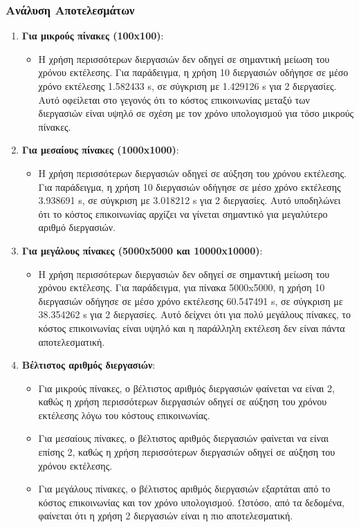 \documentclass{article}
\begin{document}
\subsubsection*{Ανάλυση Αποτελεσμάτων}
\begin{enumerate}
    \item \textbf{Για μικρούς πίνακες (100x100)}:
    \begin{itemize}
        \item Η χρήση περισσότερων διεργασιών δεν οδηγεί σε σημαντική μείωση του χρόνου εκτέλεσης. Για παράδειγμα, η χρήση 10 διεργασιών οδήγησε σε μέσο χρόνο εκτέλεσης 1.582433 s, σε σύγκριση με 1.429126 s για 2 διεργασίες. Αυτό οφείλεται στο γεγονός ότι το κόστος επικοινωνίας μεταξύ των διεργασιών είναι υψηλό σε σχέση με τον χρόνο υπολογισμού για τόσο μικρούς πίνακες.
    \end{itemize}
    \item \textbf{Για μεσαίους πίνακες (1000x1000)}:
    \begin{itemize}
        \item Η χρήση περισσότερων διεργασιών οδηγεί σε αύξηση του χρόνου εκτέλεσης. Για παράδειγμα, η χρήση 10 διεργασιών οδήγησε σε μέσο χρόνο εκτέλεσης 3.938691 s, σε σύγκριση με 3.018212 s για 2 διεργασίες. Αυτό υποδηλώνει ότι το κόστος επικοινωνίας αρχίζει να γίνεται σημαντικό για μεγαλύτερο αριθμό διεργασιών.
    \end{itemize}
    \item \textbf{Για μεγάλους πίνακες (5000x5000 και 10000x10000)}:
    \begin{itemize}
        \item Η χρήση περισσότερων διεργασιών δεν οδηγεί σε σημαντική μείωση του χρόνου εκτέλεσης. Για παράδειγμα, για πίνακα 5000x5000, η χρήση 10 διεργασιών οδήγησε σε μέσο χρόνο εκτέλεσης 60.547491 s, σε σύγκριση με 38.354262 s για 2 διεργασίες. Αυτό δείχνει ότι για πολύ μεγάλους πίνακες, το κόστος επικοινωνίας είναι υψηλό και η παράλληλη εκτέλεση δεν είναι πάντα αποτελεσματική.
    \end{itemize}
    \item \textbf{Βέλτιστος αριθμός διεργασιών}:
    \begin{itemize}
        \item Για μικρούς πίνακες, ο βέλτιστος αριθμός διεργασιών φαίνεται να είναι 2, καθώς η χρήση περισσότερων διεργασιών οδηγεί σε αύξηση του χρόνου εκτέλεσης λόγω του κόστους επικοινωνίας.
        \item Για μεσαίους πίνακες, ο βέλτιστος αριθμός διεργασιών φαίνεται να είναι επίσης 2, καθώς η χρήση περισσότερων διεργασιών οδηγεί σε αύξηση του χρόνου εκτέλεσης.
        \item Για μεγάλους πίνακες, ο βέλτιστος αριθμός διεργασιών εξαρτάται από το κόστος επικοινωνίας και τον χρόνο υπολογισμού. Ωστόσο, από τα δεδομένα, φαίνεται ότι η χρήση 2 διεργασιών είναι η πιο αποτελεσματική.
    \end{itemize}
\end{enumerate}
\end{document}
